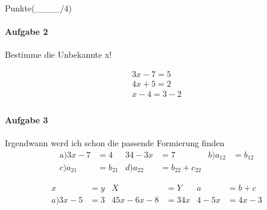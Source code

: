 \documentclass[11pt,a4paper]{scrartcl}
\begin{document}
\begin{multienumerate}
\end{multienumerate}


\begin{flushright}
Punkte(\_\_\_\_/4)
\end{flushright}

\paragraph{Aufgabe 2}
Bestimme die Unbekannte x!

\begin{align*}
3x-7=5\\
4x+5=2\\
x-4=3-2\\
\end{align*}

\paragraph{Aufgabe 3}
Irgendwann werd ich schon die passende Formierung finden
\begin{align*}
\text{a)} 3x-7&=4 & 34-3x& =7&
b)a_{12}& =b_{12}\\
c)a_{21}& =b_{21}&
d)a_{22}& =b_{22}+c_{22}
\end{align*}

\begin{align*}
x&=y & X&=Y & a&=b+c\\
a) 3x-5&=3 &45x-6x-8&=34x & 4-5x&=4x-3\\
\end{align*}
\end{document}
